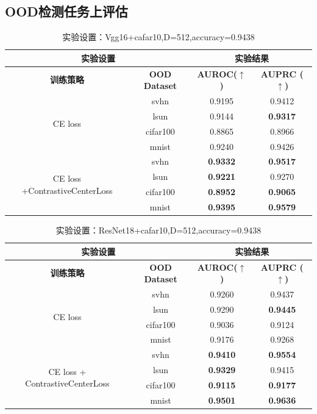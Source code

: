 \subsection{OOD检测任务上评估}
\begin{table}[H]
	\captionsetup{labelformat=empty}
	\centering
	\renewcommand{\arraystretch}{1.2} %
	\setlength{\tabcolsep}{8pt} %
	\begin{tabular}{|c|c|c|c|}
		\hline
		\multicolumn{2}{|c|}{\textbf{实验设置}} & \multicolumn{2}{c|}{\textbf{实验结果}} \\ 
		\hline
		\textbf{训练策略} & \textbf{OOD Dataset} & \textbf{ AUROC($\uparrow$)} & \textbf{ AUPRC ($\uparrow$)} \\ 
		\hline
		\multirow{4}{*}{CE loss} 
		& svhn      & 0.9195 & 0.9412 \\ 
		& lsun      & 0.9144 & \textbf{ 0.9317} \\ 
		& cifar100  & 0.8865 & 0.8966 \\ 
		& mnist     & 0.9240 & 0.9426 \\ 
		\hline
		\multirow{4}{*}{CE loss +ContrastiveCenterLoss}
		& svhn      & \textbf{ 0.9332} & \textbf{0.9517} \\ 
		& lsun      & \textbf{ 0.9221} & 0.9270 \\ 
		& cifar100  & \textbf{ 0.8952} & \textbf{0.9065} \\ 
		& mnist     & \textbf{0.9395} & \textbf{0.9579} \\ 
		\hline
	\end{tabular}
	\caption{实验设置：Vgg16+cafar10,D=512,accuracy=0.9438}
\end{table}



\begin{table}[H]
	\captionsetup{labelformat=empty}
	\centering
	\renewcommand{\arraystretch}{1.2} %
	\setlength{\tabcolsep}{8pt} %
	\begin{tabular}{|c|c|c|c|}
		\hline
		\multicolumn{2}{|c|}{\textbf{实验设置}} & \multicolumn{2}{c|}{\textbf{实验结果}} \\ 
		\hline
		\textbf{训练策略} & \textbf{OOD Dataset} & \textbf{ AUROC($\uparrow$)} & \textbf{ AUPRC ($\uparrow$)} \\ 
		\hline
		\multirow{4}{*}{CE loss} 
		&	svhn & 0.9260 & 0.9437 \\
		&	lsun &   0.9290 &\textbf{0.9445} \\
		&	cifar100 & 0.9036 & 0.9124 \\
		&	mnist   & 0.9176 & 0.9268 \\
		\hline
		\multirow{4}{*}{CE loss + ContrastiveCenterLoss}
		&	svhn&\textbf{0.9410} & \textbf{ 0.9554}\\
		&	lsun & \textbf{0.9329} & 0.9415 \\
		&	cifar100&  \textbf{0.9115} &\textbf{ 0.9177}\\
		&	mnist  &  \textbf{0.9501} & \textbf{0.9636}\\
		\hline
	\end{tabular}
	\caption{实验设置：ResNet18+cafar10,D=512,accuracy=0.9438}
\end{table}


